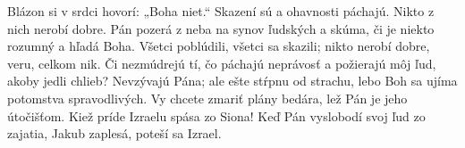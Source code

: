 Blázon si v srdci hovorí: „Boha niet.“
\versseparator
Skazení sú a ohavnosti páchajú.
Nikto z nich nerobí dobre.
\versseparator
Pán pozerá z neba na synov ľudských
a skúma, či je niekto rozumný a hľadá Boha.
\versseparator
Všetci poblúdili, všetci sa skazili;
nikto nerobí dobre, veru, celkom nik.
\versseparator
Či nezmúdrejú tí, čo páchajú neprávosť
a požierajú môj ľud, akoby jedli chlieb?
\versseparator
Nevzývajú Pána;
ale ešte stŕpnu od strachu,
\versseparator
lebo Boh sa ujíma potomstva spravodlivých.
Vy chcete zmariť plány bedára,
lež Pán je jeho útočišťom.
\versseparator
Kiež príde Izraelu spása zo Siona!
Keď Pán vyslobodí svoj ľud zo zajatia,
Jakub zaplesá, poteší sa Izrael.
